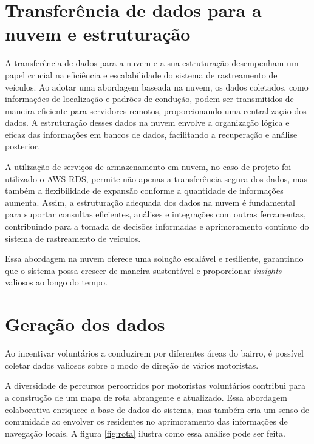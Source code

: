 \section{Transferência de dados para a nuvem e estruturação}

A transferência de dados para a nuvem e a sua estruturação desempenham um papel crucial na eficiência e escalabilidade do sistema de rastreamento de veículos. Ao adotar uma abordagem baseada na nuvem, os dados coletados, como informações de localização e padrões de condução, podem ser transmitidos de maneira eficiente para servidores remotos, proporcionando uma centralização dos dados. A estruturação desses dados na nuvem envolve a organização lógica e eficaz das informações em bancos de dados, facilitando a recuperação e análise posterior. 

A utilização de serviços de armazenamento em nuvem, no caso de projeto foi utilizado o AWS RDS, permite não apenas a transferência segura dos dados, mas também a flexibilidade de expansão conforme a quantidade de informações aumenta. Assim, a estruturação adequada dos dados na nuvem é fundamental para suportar consultas eficientes, análises e integrações com outras ferramentas, contribuindo para a tomada de decisões informadas e aprimoramento contínuo do sistema de rastreamento de veículos. 

Essa abordagem na nuvem oferece uma solução escalável e resiliente, garantindo que o sistema possa crescer de maneira sustentável e proporcionar \textit{insights} valiosos ao longo do tempo.

\section{Geração dos dados}
Ao incentivar voluntários a conduzirem por diferentes áreas do bairro, é possível coletar dados valiosos sobre o modo de direção de vários motoristas.

A diversidade de percursos percorridos por motoristas voluntários contribui para a construção de um mapa de rota abrangente e atualizado. Essa abordagem colaborativa enriquece a base de dados do sistema, mas também cria um senso de comunidade ao envolver os residentes no aprimoramento das informações de navegação locais. A figura \ref{fig:rota} ilustra como essa análise pode ser feita.

